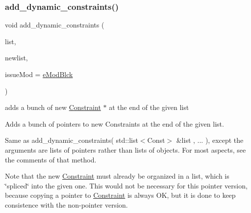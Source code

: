 \subsubsection{\texorpdfstring{add\+\_\+dynamic\+\_\+constraints()}{add\_dynamic\_constraints()}\hspace{0.1cm}{\footnotesize\ttfamily [2/2]}}
{\footnotesize\ttfamily void add\+\_\+dynamic\+\_\+constraints (\begin{DoxyParamCaption}\item[{std\+::list$<$ Const $\ast$$>$ \&}]{list,  }\item[{std\+::list$<$ Const $\ast$$>$ \&}]{newlist,  }\item[{\mbox{\hyperlink{group___modification___t_y_p_e_s_ga544246d8c462e9a2d817c2c30797968f}{c\+\_\+\+Mod\+Param}}}]{issue\+Mod = {\ttfamily \mbox{\hyperlink{group___modification___t_y_p_e_s_gga48fddcdd03a03f49b7e389ca1ed938d4a21b14b26b1c0093a0905f6fc010bad29}{e\+Mod\+Blck}}} }\end{DoxyParamCaption})}



adds a bunch of new \mbox{\hyperlink{class_s_m_spp__di__unipi__it_1_1_constraint}{Constraint}} $\ast$ at the end of the given list 

Adds a bunch of pointers to new Constraints at the end of the given list.

Same as add\+\_\+dynamic\+\_\+constraints( std\+::list$<$\+Const$>$ \&list , ... ), except the arguments are lists of pointers rather than lists of objects. For most aspects, see the comments of that method.

Note that the new \mbox{\hyperlink{class_s_m_spp__di__unipi__it_1_1_constraint}{Constraint}} must already be organized in a list, which is \char`\"{}spliced\char`\"{} into the given one. This would not be necessary for this pointer version, because copying a pointer to \mbox{\hyperlink{class_s_m_spp__di__unipi__it_1_1_constraint}{Constraint}} is always OK, but it is done to keep consistence with the non-\/pointer version. \mbox{\label{class_s_m_spp__di__unipi__it_1_1_block_ae04d4ed8bfdbc7065d5296740dd0952b}} 
